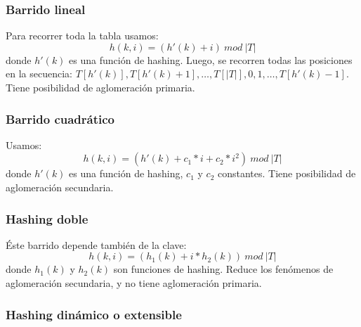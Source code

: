 \subsubsection{Barrido lineal}
Para recorrer toda la tabla usamos:
$$h(k,i) = (h'(k) + i)\ mod\ |T|$$
donde $h'(k)$ es una funci\'on de hashing. Luego, se recorren todas las posiciones en la secuencia: $T[h'(k)], T[h'(k) + 1], \dots, T[|T|], 0, 1, \dots, T[h'(k) - 1]$. Tiene posibilidad de aglomeraci\'on primaria.
\subsubsection{Barrido cuadr\'atico}
Usamos:
$$h(k,i) = (h'(k) + c_1 * i + c_2 * i^2)\ mod\ |T|$$
donde $h'(k)$ es una funci\'on de hashing, $c_1$ y $c_2$ constantes. Tiene posibilidad de aglomeraci\'on secundaria.
\subsubsection{Hashing doble}
\'Este barrido depende tambi\'en de la clave:
$$h(k,i) = (h_1(k) + i * h_2(k))\ mod\ |T|$$
donde $h_1(k)$ y $h_2(k)$ son funciones de hashing. Reduce los fen\'omenos de aglomeraci\'on secundaria, y no tiene aglomeraci\'on primaria.
\subsubsection{Hashing din\'amico o extensible}
